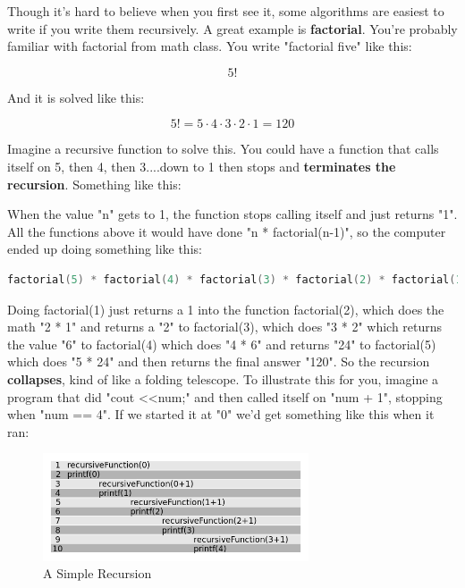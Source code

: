 \documentclass[a4paper,12pt]{article} %
\begin{document}
Though it's hard to believe when you first see it, some algorithms are easiest to write if you write them recursively. A great example is \textbf{factorial}. You're probably familiar with factorial from math class. You write "factorial five" like this:

$$5!$$

\noindent
And it is solved like this:

$$5! = 5 \cdot 4 \cdot 3 \cdot 2 \cdot 1 = 120$$

\noindent
Imagine a recursive function to solve this. You could have a function that calls itself on 5, then 4, then 3....down to 1 then stops and \textbf{terminates the recursion}. Something like this:

\vspace{5mm}


\noindent
When the value "n" gets to 1, the function stops calling itself and just returns "1". All the functions above it would have done "n * factorial(n-1)", so the computer ended up doing something like this:

\vspace{5mm}
\begin{lstlisting}[language=C++]
factorial(5) * factorial(4) * factorial(3) * factorial(2) * factorial(1)
\end{lstlisting}

\noindent
Doing factorial(1) just returns a 1 into the function factorial(2), which does the math "2 * 1" and returns a "2" to factorial(3), which does "3 * 2" which returns the value "6" to factorial(4) which does "4 * 6" and returns "24" to factorial(5) which does "5 * 24" and then returns the final answer "120". So the recursion \textbf{collapses}, kind of like a folding telescope. To illustrate this for you, imagine a program that did "cout \textless \textless \space num;" and then called itself on "num + 1", stopping when "num == 4". If we started it at "0" we'd get something like this when it ran:

\vspace{5mm}
\begin{figure}[!ht]
  \centering
  \includegraphics[width=0.7\textwidth]{recursion.png}
  \caption{A Simple Recursion}
\end{figure}
\end{document}
